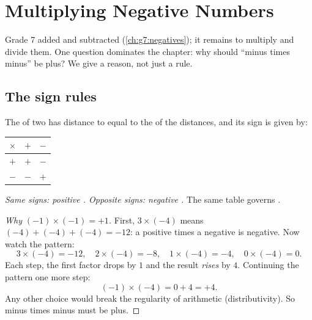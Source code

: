 \chapter{Multiplying Negative Numbers}\label{ch:g8:negprod}

Grade 7 added and subtracted 
(\cref{ch:g7:negatives}); it remains to multiply and divide them. One
question dominates the chapter: why should ``minus times minus'' be
plus? We give a reason, not just a rule.

\section{The sign rules}

\begin{theorem}\label{thm:g8:negprod:rules}
The  of two  has distance to  equal to the
 of the distances, and its sign is given by:
\begin{center}
\renewcommand{\arraystretch}{1.3}
\begin{tabular}{c|cc}
$\times$ & $+$ & $-$ \\
\hline
$+$ & $+$ & $-$ \\
$-$ & $-$ & $+$ \\
\end{tabular}
\end{center}
\emph{Same signs: positive . Opposite signs: negative .}
The same table governs .
\end{theorem}

\begin{proof}[Why $(-1) \times (-1) = +1$]
First, $3 \times (-4)$ means $(-4) + (-4) + (-4) = -12$: a positive
times a negative is negative. Now watch the pattern:
\[
3 \times (-4) = -12, \quad
2 \times (-4) = -8, \quad
1 \times (-4) = -4, \quad
0 \times (-4) = 0 .
\]
Each step, the first factor drops by $1$ and the result \emph{rises}
by $4$. Continuing the pattern one more step:
\[
(-1) \times (-4) = 0 + 4 = +4 .
\]
Any other choice would break the regularity of arithmetic
(distributivity). So minus times minus must be plus.
\end{proof}

